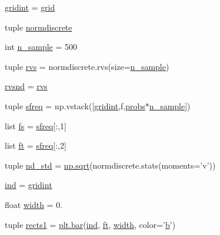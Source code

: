 \begin{DoxyCompactItemize}
\item 
\hyperlink{namespacenormdiscr__plot2_acb33a5c700b9bdb2d94bd5120a53a126}{gridint} = \hyperlink{namespacenormdiscr__plot2_a62ec823ef29766de66e391bd4a2dc284}{grid}
\item 
tuple \hyperlink{namespacenormdiscr__plot2_a2441ca073bb0331350476716954626c7}{normdiscrete}
\item 
int \hyperlink{namespacenormdiscr__plot2_a8c2b3742f5dc406632d71d4e5aa37df7}{n\+\_\+sample} = 500
\item 
tuple \hyperlink{namespacenormdiscr__plot2_a1929219debd8806bf017653adc7fc911}{rvs} = normdiscrete.\+rvs(size=\hyperlink{namespacenormdiscr__plot2_a8c2b3742f5dc406632d71d4e5aa37df7}{n\+\_\+sample})
\item 
\hyperlink{namespacenormdiscr__plot2_a9138836ed78a0a4ce4046b410560ee6c}{rvsnd} = \hyperlink{namespacenormdiscr__plot2_a1929219debd8806bf017653adc7fc911}{rvs}
\item 
tuple \hyperlink{namespacenormdiscr__plot2_a4888d25c27af56764826f51647db471a}{sfreq} = np.\+vstack(\mbox{[}\hyperlink{namespacenormdiscr__plot2_acb33a5c700b9bdb2d94bd5120a53a126}{gridint},f,\hyperlink{namespacenormdiscr__plot2_a5548df286332e74becd4b4e305f43984}{probs}$\ast$\hyperlink{namespacenormdiscr__plot2_a8c2b3742f5dc406632d71d4e5aa37df7}{n\+\_\+sample}\mbox{]})
\item 
list \hyperlink{namespacenormdiscr__plot2_a582805d46fcf8730646fa6cf7ea00b7d}{fs} = \hyperlink{namespacenormdiscr__plot2_a4888d25c27af56764826f51647db471a}{sfreq}\mbox{[}\+:,1\mbox{]}
\item 
list \hyperlink{namespacenormdiscr__plot2_aa348b068eff201e8e9175a6f94404112}{ft} = \hyperlink{namespacenormdiscr__plot2_a4888d25c27af56764826f51647db471a}{sfreq}\mbox{[}\+:,2\mbox{]}
\item 
tuple \hyperlink{namespacenormdiscr__plot2_aa6b0f5d41e331e7549b122192c1db0a0}{nd\+\_\+std} = \hyperlink{vecuops_8cc_ac9f82fdb8cd289615247f897852ee5f2}{np.\+sqrt}(normdiscrete.\+stats(moments='v'))
\item 
\hyperlink{namespacenormdiscr__plot2_ad3d531a849a128e7a798433179420165}{ind} = \hyperlink{namespacenormdiscr__plot2_acb33a5c700b9bdb2d94bd5120a53a126}{gridint}
\item 
float \hyperlink{namespacenormdiscr__plot2_a25df6e806f2a5936e42f0dbb45a6d0ab}{width} = 0.
\item 
tuple \hyperlink{namespacenormdiscr__plot2_ae6ee99a8c52300b90e4de7fc466ebfe9}{rects1} = \hyperlink{eepromer_8c_a2924c0b64ca8f0b241891bcc826b5602}{plt.\+bar}(\hyperlink{namespacenormdiscr__plot2_ad3d531a849a128e7a798433179420165}{ind}, \hyperlink{namespacenormdiscr__plot2_aa348b068eff201e8e9175a6f94404112}{ft}, \hyperlink{namespacenormdiscr__plot2_a25df6e806f2a5936e42f0dbb45a6d0ab}{width}, color='\hyperlink{gen__mat5files_8m_a7b38767b3b6a8dae167e5afa4fc340b0}{b}')

\end{DoxyCompactItemize}
